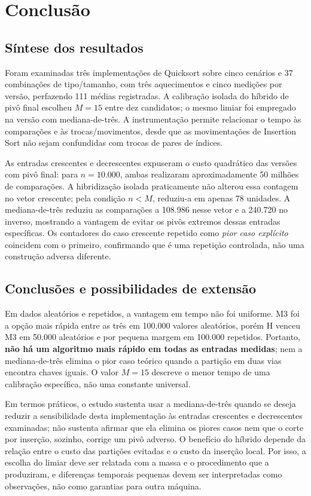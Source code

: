 \chapter{Conclusão}
\label{cap:conclusao}

\section{Síntese dos resultados}

Foram examinadas três implementações de Quicksort sobre cinco cenários e 37 combinações de tipo/tamanho, com três aquecimentos e cinco medições por versão, perfazendo 111 médias registradas. A calibração isolada do híbrido de pivô final escolheu $M=15$ entre dez candidatos; o mesmo limiar foi empregado na versão com mediana-de-três. A instrumentação permite relacionar o tempo às comparações e às trocas/movimentos, desde que as movimentações de Insertion Sort não sejam confundidas com trocas de pares de índices.

As entradas crescentes e decrescentes expuseram o custo quadrático das versões com pivô final: para $n=10.000$, ambas realizaram aproximadamente 50 milhões de comparações. A hibridização isolada praticamente não alterou essa contagem no vetor crescente; pela condição $n<M$, reduziu-a em apenas 78 unidades. A mediana-de-três reduziu as comparações a 108.986 nesse vetor e a 240.720 no inverso, mostrando a vantagem de evitar os pivôs extremos dessas entradas específicas. Os contadores do caso crescente repetido como \emph{pior caso explícito} coincidem com o primeiro, confirmando que é uma repetição controlada, não uma construção adversa diferente.

\section{Conclusões e possibilidades de extensão}

Em dados aleatórios e repetidos, a vantagem em tempo não foi uniforme. M3 foi a opção mais rápida entre as três em 100.000 valores aleatórios, porém H venceu M3 em 50.000 aleatórios e por pequena margem em 100.000 repetidos. Portanto, \textbf{não há um algoritmo mais rápido em todas as entradas medidas}; nem a mediana-de-três elimina o pior caso teórico quando a partição em duas vias encontra chaves iguais. O valor $M=15$ descreve o menor tempo de uma calibração específica, não uma constante universal.

Em termos práticos, o estudo sustenta usar a mediana-de-três quando se deseja reduzir a sensibilidade desta implementação às entradas crescentes e decrescentes examinadas; não sustenta afirmar que ela elimina os piores casos nem que o corte por inserção, sozinho, corrige um pivô adverso. O benefício do híbrido depende da relação entre o custo das partições evitadas e o custo da inserção local. Por isso, a escolha do limiar deve ser relatada com a massa e o procedimento que a produziram, e diferenças temporais pequenas devem ser interpretadas como observações, não como garantias para outra máquina.

